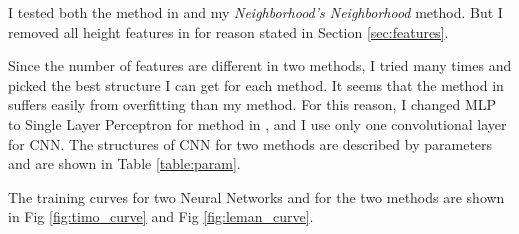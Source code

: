 \documentclass{article}
\begin{document}
\begin{table}[h!]
	\centering
	\caption{Number of samples per class}
	\label{table:samples}
\end{table}

I tested both the method in \cite{hackel2016fast} and my \textit{Neighborhood's Neighborhood} method. But I removed all height features in \cite{hackel2016fast} for reason stated in Section \ref{sec:features}. 

Since the number of features are different in two methods, I tried many times and picked the best structure I can get for each method. It seems that the method in \cite{hackel2016fast} suffers easily from overfitting than my method. For this reason, I changed MLP to Single Layer Perceptron for method in \cite{hackel2016fast}, and I use only one convolutional layer for CNN. The structures of CNN for two methods are described by parameters and are shown in Table \ref{table:param}. 

The training curves for two Neural Networks and for the two methods are shown in Fig \ref{fig:timo_curve} and Fig \ref{fig:leman_curve}.


\begin{table}[h!]
	\centering
	\caption{Parameters of convolutional neural network structure}
	\label{table:param}
\end{table}
\end{document}
